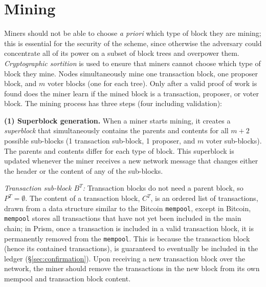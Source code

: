 
\section{Mining}
\label{sec:mining}
Miners should not be able to choose \emph{a priori} which type of block they are mining; this is essential for the security of the scheme, since otherwise the adversary could concentrate all  of its power on a subset of block trees and overpower them. 
\emph{Cryptographic sortition} is used to ensure that miners cannot choose which type of block they mine.
Nodes simultaneously mine one transaction block, one proposer block, and $m$ voter blocks (one for each tree). 
Only after a valid proof of work is found does the miner learn if the mined block is a transaction, proposer, or voter block. 
The mining process has three steps (four including validation): 

\noindent \textbf{(1) Superblock generation.} 
When a miner starts mining, it creates a \emph{superblock} that simultaneously contains the parents and contents for all $m+2$ possible sub-blocks (1 transaction sub-block, 1 proposer, and $m$ voter sub-blocks). The parents and contents differ for each type of block.
This superblock is updated whenever the miner receives a new network message that changes either the header or the content of any of the sub-blocks. 

\emph{Transaction sub-block $B^T$:} 
Transaction blocks do not need a parent block,  so  $P^T=\emptyset$.
The content of a transaction block, $C^T$, is an ordered list of transactions,  drawn from a data structure similar to the Bitcoin \texttt{mempool}, except in Bitcoin, \texttt{mempool} stores all transactions that have not yet been included in the main chain; in Prism, once a transaction is included in a valid transaction block, it is permanently removed from the \texttt{mempool}.
This is because the transaction block (hence its contained transactions), is guaranteed to eventually be included in the ledger (\S\ref{sec:confirmation}).
Upon receiving a new transaction block over the network, the miner should remove the transactions in the new block from its own mempool and transaction block content. 

